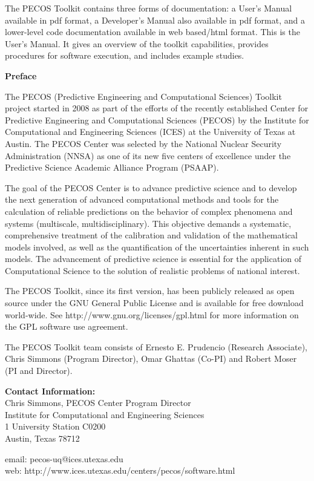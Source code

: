 The PECOS Toolkit contains three forms of documentation:
a User's Manual available in pdf format,
a Developer's Manual also available in pdf format, and
a lower-level code documentation available in web based/html format.
This is the User's Manual.
It gives an overview of the toolkit capabilities,
provides procedures for software execution, and includes example studies.

\clearpage
{\markboth{}{}
}
\tableofcontents

\clearpage
\thispagestyle{empty}
\centerline{\Large\bf Preface}
$~$\\
The PECOS (Predictive Engineering and Computational Sciences) Toolkit project started in 2008 as part
of the efforts of the recently established Center for Predictive Engineering and Computational Sciences (PECOS)
by the Institute for Computational and Engineering Sciences (ICES) at the University of Texas at Austin.
The PECOS Center was selected by the National Nuclear Security Administration (NNSA) as one of its new five centers of excellence
under the Predictive Science Academic Alliance Program (PSAAP).

The goal of the PECOS Center is
to advance predictive science and to develop the next generation of advanced computational methods and tools
for the calculation of reliable predictions on the behavior of complex phenomena and systems (multiscale, multidisciplinary).
This objective demands a systematic, comprehensive treatment of the calibration and validation of the mathematical models involved,
as well as the quantification of the uncertainties inherent in such models.
The advancement of predictive science is essential for the application of Computational Science to the solution of realistic problems of national interest.

The PECOS Toolkit, since its first version, has been publicly released as open source
under the GNU General Public License and is available for free download world-wide.
See http://www.gnu.org/licenses/gpl.html for more information on the GPL software use agreement.

The PECOS Toolkit team consists of
Ernesto E. Prudencio (Research Associate),
Chris Simmons (Program Director),
Omar Ghattas (Co-PI) and
Robert Moser (PI and Director).

{\bf Contact Information:}\\
Chris Simmons, PECOS Center Program Director\\
Institute for Computational and Engineering Sciences\\
1 University Station C0200\\
Austin, Texas 78712

email: pecos-uq@ices.utexas.edu\\
web: http://www.ices.utexas.edu/centers/pecos/software.html

\clearpage
$~$\\
